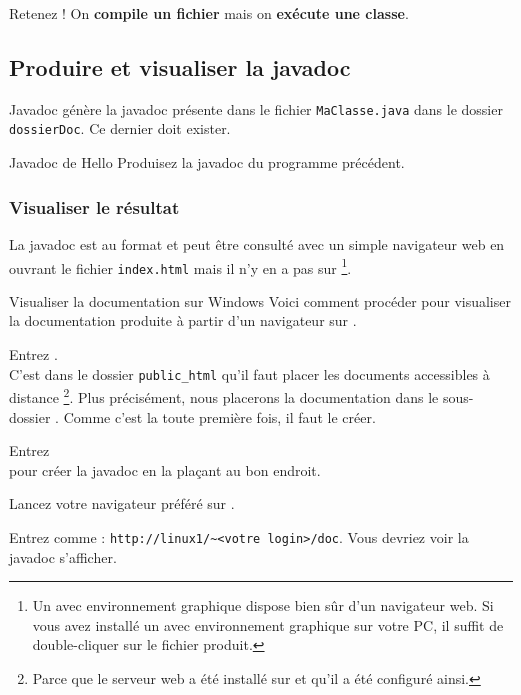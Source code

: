 \documentclass[a4paper,11pt]{style-esi/td}
\begin{document}
		\begin{alerttbox}{Retenez !} 
			On \textbf{compile un fichier} mais on \textbf{exécute une classe}.
		\end{alerttbox}

	\subsection{Produire et visualiser la javadoc}

		\begin{theorie}{Javadoc}
			génère la javadoc présente dans le fichier \texttt{MaClasse.java}
			dans le dossier \texttt{dossierDoc}. Ce dernier doit exister.
		\end{theorie}

		\begin{Exercice}{Javadoc de Hello}
			Produisez la javadoc du programme  précédent.
		\end{Exercice}

		\subsubsection*{Visualiser le résultat}

		La javadoc est au format  et peut être consulté
		avec un simple navigateur web en ouvrant le fichier \verb|index.html|
		mais il n'y en a pas sur %
		\footnote{%
			Un  avec environnement graphique 
			dispose bien sûr d'un navigateur web.
			Si vous avez installé un  avec environnement graphique
			sur votre PC, il suffit de double-cliquer sur le fichier
			 produit.
		}.

		\begin{Tutoriel}{Visualiser la documentation sur Windows}
			Voici comment procéder pour visualiser la documentation
			produite à partir d'un navigateur sur .
			\begin{steps}
			\item 
				Entrez .
				\\
				C'est dans le dossier \verb|public_html|
				qu'il faut placer les documents accessibles à distance%
				\footnote{%
					Parce que le serveur web  a été installé
					sur  et qu'il a été configuré ainsi.
				}.
				Plus précisément, nous placerons la documentation
				dans le sous-dossier .
				Comme c'est la toute première fois, il faut le créer.
			\item 
				Entrez 
				\\pour créer la javadoc en la plaçant au bon endroit.
			\item 
				Lancez votre navigateur préféré sur .
			\item 
				Entrez comme  : \verb|http://linux1/~<votre login>/doc|.
				Vous devriez voir la javadoc s'afficher.
			\end{steps}
		\end{Tutoriel}
\end{document}
